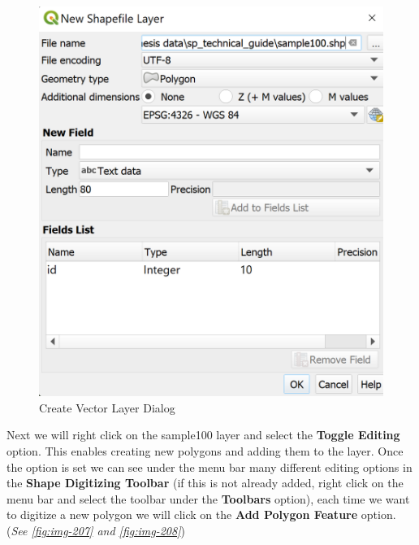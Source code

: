 \documentclass[
]{book}
\begin{document}
\begin{figure}

{\centering \includegraphics[width=0.7\linewidth]{images/createvec2} 

}

\caption{Create Vector Layer Dialog}\label{fig:img-206}
\end{figure}

Next we will right click on the {sample100} layer and select the \textbf{Toggle Editing} option. This enables creating new polygons and adding them to the layer. Once the option is set we can see under the menu bar many different editing options in the \textbf{Shape Digitizing Toolbar} (if this is not already added, right click on the menu bar and select the toolbar under the \textbf{Toolbars} option), each time we want to digitize a new polygon we will click on the \textbf{Add Polygon Feature} option. (\emph{See \ref{fig:img-207} and \ref{fig:img-208}})
\end{document}
